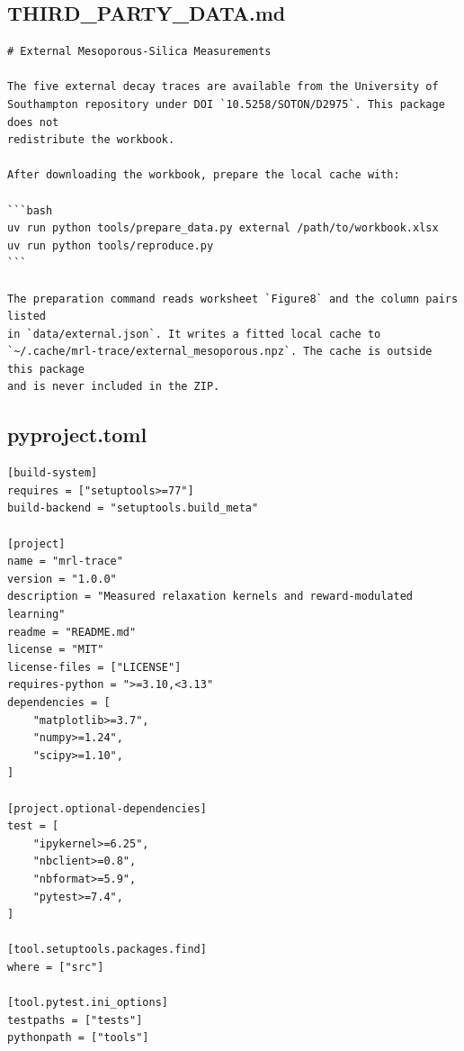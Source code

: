 \documentclass[a4paper,10pt]{article}
\begin{document}
\subsection{THIRD\_PARTY\_DATA.md}
\begin{Verbatim}
# External Mesoporous-Silica Measurements

The five external decay traces are available from the University of
Southampton repository under DOI `10.5258/SOTON/D2975`. This package does not
redistribute the workbook.

After downloading the workbook, prepare the local cache with:

```bash
uv run python tools/prepare_data.py external /path/to/workbook.xlsx
uv run python tools/reproduce.py
```

The preparation command reads worksheet `Figure8` and the column pairs listed
in `data/external.json`. It writes a fitted local cache to
`~/.cache/mrl-trace/external_mesoporous.npz`. The cache is outside this package
and is never included in the ZIP.
\end{Verbatim}
\subsection{pyproject.toml}
\begin{Verbatim}
[build-system]
requires = ["setuptools>=77"]
build-backend = "setuptools.build_meta"

[project]
name = "mrl-trace"
version = "1.0.0"
description = "Measured relaxation kernels and reward-modulated learning"
readme = "README.md"
license = "MIT"
license-files = ["LICENSE"]
requires-python = ">=3.10,<3.13"
dependencies = [
    "matplotlib>=3.7",
    "numpy>=1.24",
    "scipy>=1.10",
]

[project.optional-dependencies]
test = [
    "ipykernel>=6.25",
    "nbclient>=0.8",
    "nbformat>=5.9",
    "pytest>=7.4",
]

[tool.setuptools.packages.find]
where = ["src"]

[tool.pytest.ini_options]
testpaths = ["tests"]
pythonpath = ["tools"]
\end{Verbatim}
\end{document}
